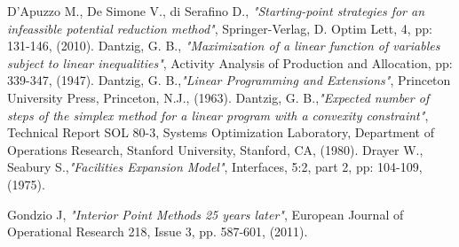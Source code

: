 \documentclass[a4paper,10 pt,titlepage,twoside]{book}
\theoremstyle{plain}
\theoremstyle{definition}
\theoremstyle{remark}
\begin{document}
{{\begin{thebibliography}{9}
	 D'Apuzzo M., De Simone V., di Serafino D., \emph{"Starting-point strategies for an infeassible potential reduction method"}, Springer-Verlag, D. Optim Lett, 4, pp: 131-146, (2010).
	Dantzig, G. B., \emph{"Maximization of a linear function of variables subject to linear
	inequalities"}, Activity Analysis of Production and Allocation, pp: 339-347, (1947).
	Dantzig, G. B.,\emph{\;"Linear Programming and Extensions"}, Princeton University Press, Princeton, N.J., (1963).	
	Dantzig, G. B.,\emph{\;"Expected number of steps of the simplex method for a linear program with a convexity constraint"}, Technical Report SOL 80-3, Systems Optimization Laboratory, Department of Operations Research, Stanford University, Stanford, CA, (1980).
	Drayer W., Seabury S.,\emph{\;"Facilities Expansion Model"}, Interfaces, 5:2, part 2, pp: 104-109, (1975).
	
	
	 Gondzio J, \textit{ "Interior Point Methods 25 years later"}, European Journal of Operational Research 218, Issue 3, pp. 587-601, (2011).	
	

\end{thebibliography}}}
\end{document}
